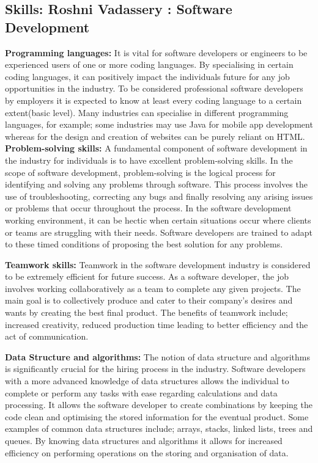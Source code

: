 \documentclass[a4paper, 11pt]{report}
\begin{document}
\subsection{Skills: Roshni Vadassery : Software Development}

\textbf{Programming languages:} 
It is vital for software developers or engineers to be experienced users of one or more coding languages. By specialising in certain coding languages, it can positively impact the individuals future for any job opportunities in the industry. To be considered professional software developers by employers it is expected to know at least every coding language to a certain extent(basic level). Many industries can specialise in different programming languages, for example; some industries may use Java for mobile app development whereas for the design and creation of websites can be purely reliant on HTML.          
\textbf{Problem-solving skills:} 
A fundamental component of software development in the industry for individuals is to have excellent problem-solving skills. In the scope of software development, problem-solving is the logical process for identifying and solving any problems through software. This process involves the use of troubleshooting, correcting any bugs and finally resolving any arising issues or problems that occur throughout the process. In the software development working environment, it can be hectic when certain situations occur where clients or teams are struggling with their needs. Software developers are trained to adapt to these timed conditions of proposing the best solution for any problems.  

\textbf{Teamwork skills:} 
Teamwork in the software development industry is considered to be extremely efficient for future success. As a software developer, the job involves working collaboratively as a team to complete any given projects. The main goal is to collectively produce and cater to their company's desires and wants by creating the best final product. The benefits of teamwork include; increased creativity, reduced production time leading to better efficiency and the act of communication.     

\textbf{Data Structure and algorithms:} 
The notion of data structure and algorithms is significantly crucial for the hiring process in the industry. Software developers with a more advanced knowledge of data structures allows the individual to complete or perform any tasks with ease regarding calculations and data processing. It allows the software developer to create combinations by keeping the code clean and optimising the stored information for the eventual product. Some examples of common data structures include; arrays, stacks, linked lists, trees and queues. By knowing data structures and algorithms it allows for increased efficiency on performing operations on the storing and organisation of data. 
\end{document}
